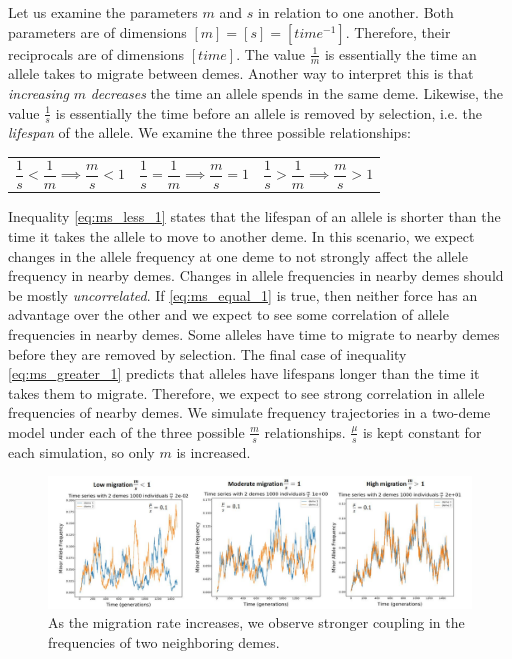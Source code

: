 Let us examine the parameters $m$ and $s$ in relation to one another. Both parameters are of dimensions $[m] = [s] = [time^{-1}]$. Therefore, their reciprocals are of dimensions $[time]$. The value $\frac{1}{m}$ is essentially the time an allele takes to migrate between demes. Another way to interpret this is that \textit{increasing} $m$ \textit{decreases} the time an allele spends in the same deme. Likewise, the value $\frac{1}{s}$ is essentially the time before an allele is removed by selection, i.e. the \textit{lifespan} of the allele. We examine the three possible relationships:

\noindent\begin{tabularx}{\textwidth}{@{}XXX@{}}
  \begin{equation} 
           \frac{1}{s} < \frac{1}{m}
    \implies \frac{m}{s} < 1 
    \label{eq:ms_less_1}
  \end{equation} &
  \begin{equation}
           \frac{1}{s} = \frac{1}{m}
    \implies \frac{m}{s} = 1 
    \label{eq:ms_equal_1}
  \end{equation} &
  \begin{equation}
           \frac{1}{s} > \frac{1}{m}
    \implies \frac{m}{s} > 1 
    \label{eq:ms_greater_1}
  \end{equation}
\end{tabularx}

Inequality \ref{eq:ms_less_1} states that the lifespan of an allele is shorter than the time it takes the allele to move to another deme. In this scenario, we expect changes in the allele frequency at one deme to not strongly affect the allele frequency in nearby demes. Changes in allele frequencies in nearby demes should be mostly \textit{uncorrelated}. If \ref{eq:ms_equal_1} is true, then neither force has an advantage over the other and we expect to see some correlation of allele frequencies in nearby demes. Some alleles have time to migrate to nearby demes before they are removed by selection. The final case of inequality \ref{eq:ms_greater_1} predicts that alleles have lifespans longer than the time it takes them to migrate. Therefore, we expect to see strong correlation in allele frequencies of nearby demes. We simulate frequency trajectories in a two-deme model under each of the three possible $\frac{m}{s}$ relationships. $\frac{\mu}{s}$ is kept constant for each simulation, so only $m$ is increased.


\begin{figure}[H]
    \centering
    \hspace*{-2cm}
    \includegraphics[scale=0.5]{img/low_high_migration.JPG}
    \caption{As the migration rate increases, we observe stronger coupling in the frequencies of two neighboring demes.}
    \label{fig:low_high_m}
\end{figure}



